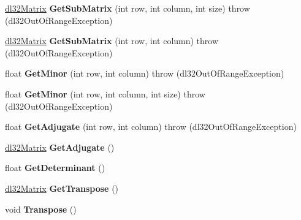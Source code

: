 \begin{DoxyCompactItemize}
\item 
\hypertarget{classdl32_matrix_ac95a94aaeb592b0e728bbbd64513adc7}{\hyperlink{classdl32_matrix}{dl32\-Matrix} {\bfseries Get\-Sub\-Matrix} (int row, int column, int size)  throw (dl32\-Out\-Of\-Range\-Exception)}\label{classdl32_matrix_ac95a94aaeb592b0e728bbbd64513adc7}

\item 
\hypertarget{classdl32_matrix_a09662e9d5313f3f5b48e3f52e69916ca}{\hyperlink{classdl32_matrix}{dl32\-Matrix} {\bfseries Get\-Sub\-Matrix} (int row, int column)  throw (dl32\-Out\-Of\-Range\-Exception)}\label{classdl32_matrix_a09662e9d5313f3f5b48e3f52e69916ca}

\item 
\hypertarget{classdl32_matrix_ab3be1ba62592ab58580baf399f83c96b}{float {\bfseries Get\-Minor} (int row, int column)  throw (dl32\-Out\-Of\-Range\-Exception)}\label{classdl32_matrix_ab3be1ba62592ab58580baf399f83c96b}

\item 
\hypertarget{classdl32_matrix_a369173790e9ad1ba2ccdcc6c94ce7914}{float {\bfseries Get\-Minor} (int row, int column, int size)  throw (dl32\-Out\-Of\-Range\-Exception)}\label{classdl32_matrix_a369173790e9ad1ba2ccdcc6c94ce7914}

\item 
\hypertarget{classdl32_matrix_a06c904a1752d9447a660bd275d48bcbd}{float {\bfseries Get\-Adjugate} (int row, int column)  throw (dl32\-Out\-Of\-Range\-Exception)}\label{classdl32_matrix_a06c904a1752d9447a660bd275d48bcbd}

\item 
\hypertarget{classdl32_matrix_a6e2d8d5961e301604fb230348420516e}{\hyperlink{classdl32_matrix}{dl32\-Matrix} {\bfseries Get\-Adjugate} ()}\label{classdl32_matrix_a6e2d8d5961e301604fb230348420516e}

\item 
\hypertarget{classdl32_matrix_a8b7a7942d26fec9c58c7ea16ffd131e9}{float {\bfseries Get\-Determinant} ()}\label{classdl32_matrix_a8b7a7942d26fec9c58c7ea16ffd131e9}

\item 
\hypertarget{classdl32_matrix_aabe77a830c2ba2530ac5e0fbffa6ccf3}{\hyperlink{classdl32_matrix}{dl32\-Matrix} {\bfseries Get\-Transpose} ()}\label{classdl32_matrix_aabe77a830c2ba2530ac5e0fbffa6ccf3}

\item 
\hypertarget{classdl32_matrix_ab01a369e2ce838b68a3a923a5eefa935}{void {\bfseries Transpose} ()}\label{classdl32_matrix_ab01a369e2ce838b68a3a923a5eefa935}


\end{DoxyCompactItemize}
